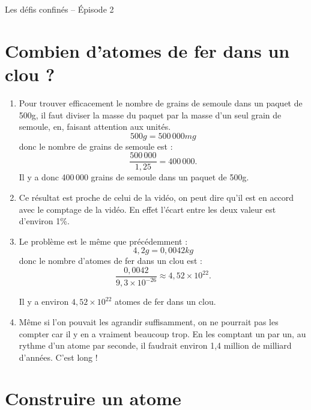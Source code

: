 \documentclass[12pt,a4paper]{article}
\begin{document}
\begin{header}
Les défis confinés -- Épisode 2
\end{header}

\section*{Combien d'atomes de fer dans un clou ?}

\begin{enumerate}
\item Pour trouver efficacement le nombre de grains de semoule dans un paquet de \unit{500}{g}, il faut diviser la masse du paquet par la masse d'un seul grain de semoule, en, faisant attention aux unités.
\[
\unit{500}{g} = \unit{500\,000}{mg}
\]
donc le nombre de grains de semoule est : 
\[
\frac{500\,000}{1{,}25} = 400\,000.
\]
Il y a donc 400\,000 grains de semoule dans un paquet de \unit{500}{g}.

\item Ce résultat est proche de celui de la vidéo, on peut dire qu'il est en accord avec le comptage de la vidéo.
En effet l'écart entre les deux valeur est d'environ \unit{1}{\%}.

\item Le problème est le même que précédemment :
\[
\unit{4{,}2}{g} = \unit{0{,}0042}{kg}
\]
donc le nombre d'atomes de fer dans un clou est :
\[
\frac{0{,}0042}{9{,}3\times 10^{-26}} \approx 4{,}52\times 10^{22}.
\]

Il y a environ $4{,}52\times 10^{22}$ atomes de fer dans un clou.

\item Même si l'on pouvait les agrandir suffisamment, on ne pourrait pas les compter car il y en a vraiment beaucoup trop.
En les comptant un par un, au rythme d'un atome par seconde, il faudrait environ 1{,}4 million de milliard d'années.
C'est long !
\end{enumerate}

\section*{Construire un atome}
\end{document}
